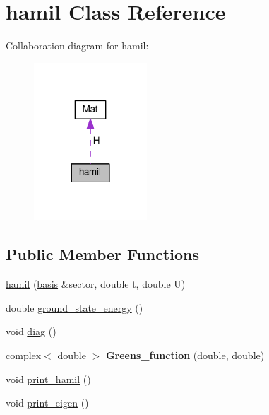 \hypertarget{classhamil}{}\section{hamil Class Reference}
\label{classhamil}


Collaboration diagram for hamil\+:\nopagebreak
\begin{figure}[H]
\begin{center}
\leavevmode
\includegraphics[width=120pt]{classhamil__coll__graph}
\end{center}
\end{figure}
\subsection*{Public Member Functions}
\begin{DoxyCompactItemize}
\item 
\hyperlink{classhamil_ad94d7476758c98d5b2af73f73d92e295}{hamil} (\hyperlink{classbasis}{basis} \&sector, double t, double U)
\item 
double \hyperlink{classhamil_a49c2202b93e45e07636a73679c62e55c}{ground\+\_\+state\+\_\+energy} ()
\item 
void \hyperlink{classhamil_a3e686a737e1019cea6dd3617065a7a7e}{diag} ()
\item 
complex$<$ double $>$ {\bfseries Greens\+\_\+function} (double, double)\hypertarget{classhamil_af3f1cab0e7c3a187df9b48de191c73ef}{}\label{classhamil_af3f1cab0e7c3a187df9b48de191c73ef}

\item 
void \hyperlink{classhamil_a607d29abc7e23f3097a546b1affa384b}{print\+\_\+hamil} ()
\item 
void \hyperlink{classhamil_ad0939704cbb18eaac49cce5961a28f9d}{print\+\_\+eigen} ()
\end{DoxyCompactItemize}
